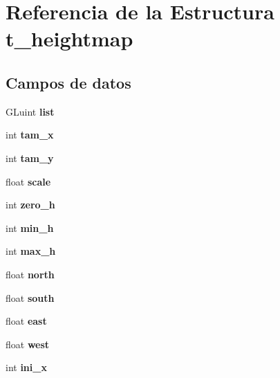\section{Referencia de la Estructura t\_\-heightmap}
\label{structt__heightmap}
\subsection*{Campos de datos}
\begin{DoxyCompactItemize}
\item 
GLuint {\bfseries list}\label{structt__heightmap_a9b04984c98cb174582db6a4a82a7aaf9}

\item 
int {\bfseries tam\_\-x}\label{structt__heightmap_a843f6d5026240145775f5cc674e5fc0c}

\item 
int {\bfseries tam\_\-y}\label{structt__heightmap_afab11b6d0545e3d37c1e60ca6560a4a1}

\item 
float {\bfseries scale}\label{structt__heightmap_a1d28dec57cce925ad92342891bd71e7c}

\item 
int {\bfseries zero\_\-h}\label{structt__heightmap_a57c6b1082beb440a43db97905bc6eba6}

\item 
int {\bfseries min\_\-h}\label{structt__heightmap_aa6c4880de408e974aca3fec7a1be1f64}

\item 
int {\bfseries max\_\-h}\label{structt__heightmap_a3d41cf2176a047cfb27676651e527a14}

\item 
float {\bfseries north}\label{structt__heightmap_a0d1a68e1994a98e1580f28cbc9989c99}

\item 
float {\bfseries south}\label{structt__heightmap_abd6097e69d0b866c7e339db4fde743b7}

\item 
float {\bfseries east}\label{structt__heightmap_a6bfd19622a0669e50f8b27d153eb0dd1}

\item 
float {\bfseries west}\label{structt__heightmap_aa40092be3bf97498295d5db5efbaa5fa}

\item 
int {\bfseries ini\_\-x}\label{structt__heightmap_ac69fe3898468404799eac7f7991d852b}


\end{DoxyCompactItemize}
